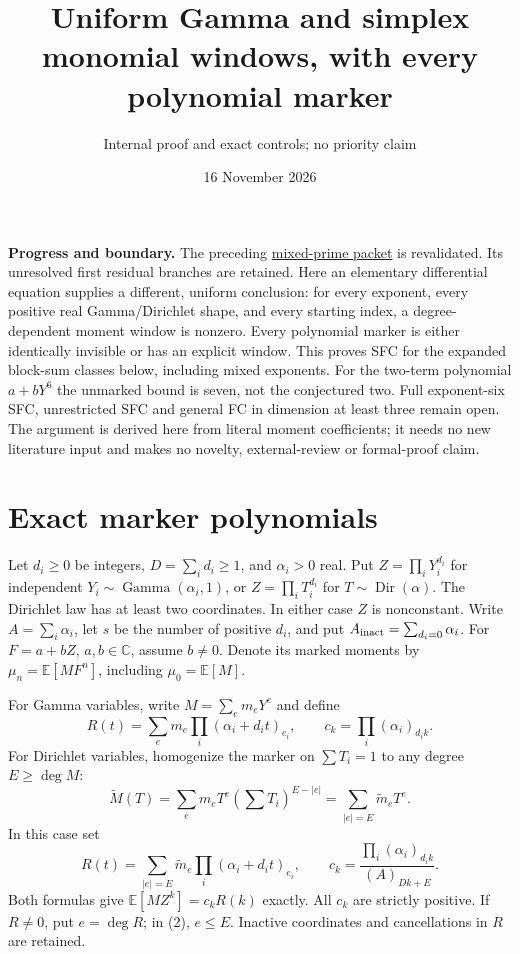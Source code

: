 \documentclass[11pt]{article}
\title{Uniform Gamma and simplex monomial windows, with every polynomial marker}
\author{Internal proof and exact controls; no priority claim}
\date{16 November 2026}
\newcommand{\C}{\mathbb C}
\newcommand{\E}{\mathbb E}
\begin{document}
\maketitle
\noindent\textbf{Progress and boundary.}
The preceding \href{MIXED_PRIME_RESIDUAL_WINDOWS.tex}{mixed-prime packet}
is revalidated. Its unresolved first residual branches are retained.
Here an elementary differential equation supplies a different, uniform
conclusion: for every exponent, every positive real Gamma/Dirichlet shape,
and every starting index, a degree-dependent moment window is nonzero.
Every polynomial marker is either identically invisible or has an explicit
window. This proves SFC for the expanded block-sum classes below, including
mixed exponents. For the two-term polynomial $a+bY^6$ the unmarked bound
is seven, not the conjectured two. Full exponent-six SFC, unrestricted SFC
and general FC in dimension at least three remain open.
The argument is derived here from literal moment coefficients; it needs no
new literature input and makes no novelty, external-review or formal-proof claim.

\section{Exact marker polynomials}
Let $d_i\geq0$ be integers, $D=\sum_i d_i\geq1$, and $\alpha_i>0$ real.
Put $Z=\prod_i Y_i^{d_i}$ for independent $Y_i\sim\operatorname{Gamma}(\alpha_i,1)$,
or $Z=\prod_i T_i^{d_i}$ for $T\sim\operatorname{Dir}(\alpha)$.
The Dirichlet law has at least two coordinates. In either case $Z$ is
nonconstant. Write $A=\sum_i\alpha_i$, let $s$ be the number of positive
$d_i$, and put $A_{\rm inact}=\sum_{d_i=0}\alpha_i$.
For $F=a+bZ$, $a,b\in\C$, assume $b\ne0$. Denote its marked moments by
$\mu_n=\E[M F^n]$, including $\mu_0=\E[M]$.

For Gamma variables, write $M=\sum_e m_eY^e$ and define
\[
 R(t)=\sum_e m_e\prod_i(\alpha_i+d_it)_{e_i},\qquad
 c_k=\prod_i(\alpha_i)_{d_i k}.                         \tag{1}
\]
For Dirichlet variables, homogenize the marker on $\sum T_i=1$ to any
degree $E\geq\deg M$:
\[
 \widetilde M(T)=\sum_e m_eT^e(\sum T_i)^{E-|e|}
                 =\sum_{|e|=E}\widetilde m_e T^e.
\]
In this case set
\[
 R(t)=\sum_{|e|=E}\widetilde m_e\prod_i(\alpha_i+d_it)_{e_i},\qquad
 c_k=\frac{\prod_i(\alpha_i)_{d_i k}}{(A)_{Dk+E}}.       \tag{2}
\]
Both formulas give $\E[M Z^k]=c_kR(k)$ exactly. All $c_k$ are strictly
positive. If $R\ne0$, put $e=\deg R$; in (2), $e\leq E$.
Inactive coordinates and cancellations in $R$ are retained.
\end{document}

